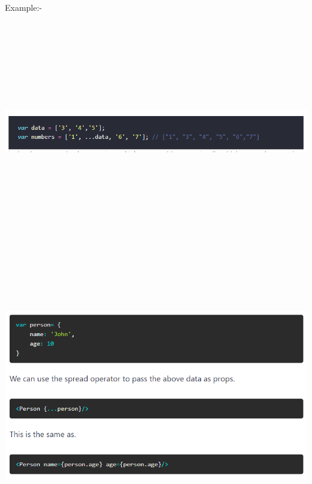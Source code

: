 \documentclass{article}
\begin{document}
\noindent 

\noindent 

\noindent 

\noindent 

\noindent 

\noindent 

\noindent 

\noindent 



\noindent \\
Example:-

\noindent 

\begin{center}
	\noindent \includegraphics*[width=6.25in, height=3.77in]{IMG-10-01}
\end{center}

\noindent 

\noindent 

\noindent 

\noindent 

\begin{center}
	\noindent \includegraphics*[width=6.27in, height=5.00in]{IMG-10-02}
\end{center}
\end{document}
